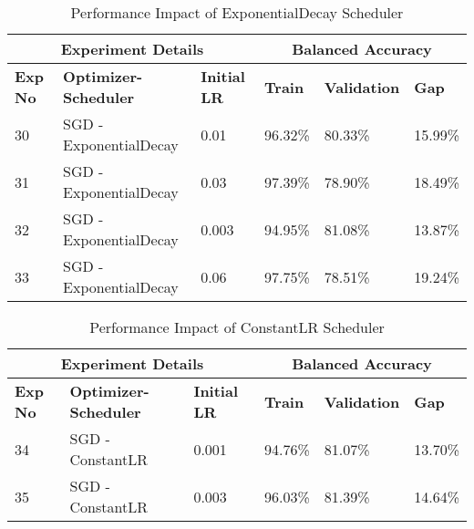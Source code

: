\begin{table}[t]
\caption{Performance Impact of ExponentialDecay Scheduler}
\label{table:exponentialdecay-performance}
\begin{center}
\small
\begin{tabular}{llllll}
\multicolumn{3}{c}{\bf{Experiment Details}} & \multicolumn{3}{c}{\bf{Balanced Accuracy}} \\
\hline
\bf{Exp No} & \bf{Optimizer-Scheduler} & \bf{Initial LR} & \bf{Train} & \bf{Validation} & \bf{Gap} \\
\hline
30 & SGD - ExponentialDecay & 0.01 & 96.32\% & 80.33\% & 15.99\% \\
31 & SGD - ExponentialDecay & 0.03 & 97.39\% & 78.90\% & 18.49\% \\
32 & SGD - ExponentialDecay & 0.003 & 94.95\% & 81.08\% & 13.87\% \\
33 & SGD - ExponentialDecay & 0.06 & 97.75\% & 78.51\% & 19.24\% \\
\hline
\end{tabular}
\end{center}
\end{table}

\begin{table}[t]
\caption{Performance Impact of ConstantLR Scheduler}
\label{table:constantlr-performance}
\begin{center}
\small
\begin{tabular}{llllll}
\multicolumn{3}{c}{\bf{Experiment Details}} & \multicolumn{3}{c}{\bf{Balanced Accuracy}} \\
\hline
\bf{Exp No} & \bf{Optimizer-Scheduler} & \bf{Initial LR} & \bf{Train} & \bf{Validation} & \bf{Gap} \\
\hline
34 & SGD - ConstantLR & 0.001 & 94.76\% & 81.07\% & 13.70\% \\
35 & SGD - ConstantLR & 0.003 & 96.03\% & 81.39\% & 14.64\% \\
\hline
\end{tabular}
\end{center}
\end{table}